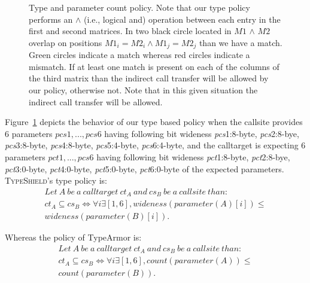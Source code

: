 \begin{figure}[H]
{\begin{tikzpicture}[shorten >=1pt,node distance=2cm,on grid,auto]
\end{tikzpicture}}
\caption{Type and parameter count policy. 
Note that our type policy performs an $\wedge$ (i.e., logical and) operation
between each entry in the first and second matrices. 
In two black circle located in $M1$ $\wedge$ $M2$ overlap on positions $M1_{i} = M2_{i} \wedge M1_{j} = M2_{j}$ than we have a match.
Green circles indicate a match whereas red circles indicate a mismatch.
If at least one match is present on each of the columns of the 
third matrix than the indirect call transfer will be allowed by our policy, 
otherwise not. Note that in this given situation
the indirect call transfer will be allowed.}
\label{Type and parameter count policy.}
\end{figure}

Figure~\ref{Type and parameter count policy.} depicts the behavior of our type based policy
when the callsite provides 6 parameters $pcs1, ..., pcs6$ having following bit 
wideness \textit{pcs}1:8-byte, \textit{pcs}2:8-bye, \textit{pcs}3:8-byte, \textit{pcs}4:8-byte, \textit{pcs}5:4-byte, 
\textit{pcs}6:4-byte, and the calltarget is expecting 6 parameters $pct1, ..., pcs6$ having following bit 
wideness \textit{pct}1:8-byte, \textit{pct}2:8-bye, \textit{pct}3:0-byte, \textit{pct}4:0-byte, \textit{pct}5:0-byte, 
\textit{pct}6:0-byte of the expected parameters. 
\textsc{TypeShield}'s type policy is: 
\begin{multline}
Let \ A \ be \ a \ calltarget \ ct_{A} \ and \ cs_{B} \ be \ a \ callsite \ than: 
\\ ct_{A} \subseteq cs_{B} \iff \forall i \exists [1, 6], 
wideness(parameter(A)[i]) \leq \\ wideness(parameter(B)[i]).
\end{multline}

Whereas the policy of TypeArmor is: 
\begin{multline}
Let \ A \ be \ a \ calltarget \ ct_{A} \ and \ cs_{B} \ be \ a \ callsite \ than: 
\\ ct_{A} \subseteq cs_{B} \iff \forall i \exists [1, 6], 
count(parameter(A)) \leq \\ count(parameter(B)).
\end{multline}


